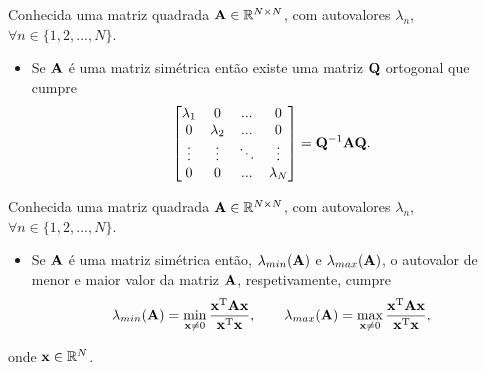 \begin{theorem}\label{theo:simetricmatrix2}
Conhecida uma matriz quadrada $\MATRIX{A} \in \mathbb{R}^{N \times N}$, 
com  autovalores $\lambda_n$, $\forall n \in \{1, 2, ..., N\}$.
\begin{itemize}
\item Se $\MATRIX{A}$ é uma matriz simétrica então
existe uma matriz $\MATRIX{Q}$ ortogonal que cumpre \cite[pp. 67,440]{golub2013matrix}
\begin{equation}
\begin{bmatrix}
\lambda_1 & 0         & ...    & 0 \\
0         & \lambda_2 & ...    & 0 \\
\vdots    & \vdots    & \ddots & \vdots \\
0         & 0         & ...    & \lambda_N
\end{bmatrix}
=\MATRIX{Q}^{-1}\MATRIX{A}\MATRIX{Q}.
\end{equation}
\end{itemize}
\end{theorem}

\begin{theorem}\label{theo:simetricmatrix3}
Conhecida uma matriz quadrada $\MATRIX{A} \in \mathbb{R}^{N \times N}$, 
com  autovalores $\lambda_n$, $\forall n \in \{1, 2, ..., N\}$.
\begin{itemize}
\item Se $\MATRIX{A}$ é uma matriz simétrica então, $\lambda_{min}(\MATRIX{A})$ e $\lambda_{max}(\MATRIX{A})$,
o autovalor de menor e maior valor da  matriz $\MATRIX{A}$, respetivamente, cumpre \cite[pp. 67]{golub2013matrix}
\begin{equation}
\lambda_{min}(\MATRIX{A}) = \min_{\VECTOR{x}\neq 0} \frac{\VECTOR{x}^{\transpose}\MATRIX{A}\VECTOR{x}}{\VECTOR{x}^{\transpose}\VECTOR{x}},
\qquad
\lambda_{max}(\MATRIX{A}) = \max_{\VECTOR{x}\neq 0} \frac{\VECTOR{x}^{\transpose}\MATRIX{A}\VECTOR{x}}{\VECTOR{x}^{\transpose}\VECTOR{x}},
\end{equation}
\end{itemize}
onde $\VECTOR{x} \in \mathbb{R}^N$.
\end{theorem}

